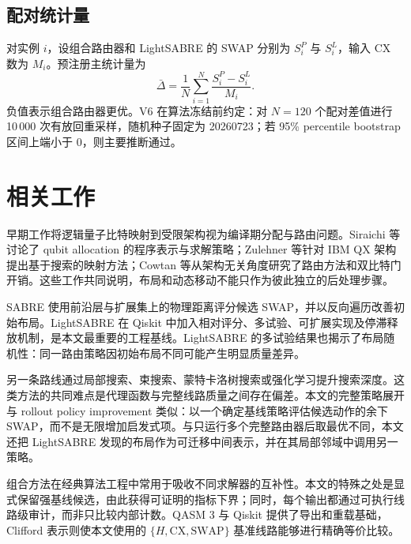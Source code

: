 \documentclass[11pt,a4paper]{article}
\begin{document}
\subsection{配对统计量}

对实例 $i$，设组合路由器和 LightSABRE 的 SWAP 分别为 $S_i^{P}$ 与 $S_i^{L}$，输入 CX 数为 $M_i$。预注册主统计量为
\begin{equation}
  \bar{\Delta}
  =\frac{1}{N}\sum_{i=1}^{N}
  \frac{S_i^{P}-S_i^{L}}{M_i}.
  \label{eq:normalized-gap}
\end{equation}
负值表示组合路由器更优。V6 在算法冻结前约定：对 $N=120$ 个配对差值进行 10\,000 次有放回重采样，随机种子固定为 20260723；若 95\% percentile bootstrap 区间上端小于 0，则主要推断通过\citep{Efron1979Bootstrap}。

\section{相关工作}

早期工作将逻辑量子比特映射到受限架构视为编译期分配与路由问题。Siraichi 等讨论了 qubit allocation 的程序表示与求解策略\citep{Siraichi2018QubitAllocation}；Zulehner 等针对 IBM QX 架构提出基于搜索的映射方法\citep{Zulehner2018Mapping}；Cowtan 等从架构无关角度研究了路由方法和双比特门开销\citep{Cowtan2019Routing}。这些工作共同说明，布局和动态移动不能只作为彼此独立的后处理步骤。

SABRE 使用前沿层与扩展集上的物理距离评分候选 SWAP，并以反向遍历改善初始布局\citep{Li2019SABRE}。LightSABRE 在 Qiskit 中加入相对评分、多试验、可扩展实现及停滞释放机制，是本文最重要的工程基线\citep{Zou2024LightSABRE,JavadiAbhari2024Qiskit}。LightSABRE 的多试验结果也揭示了布局随机性：同一路由策略因初始布局不同可能产生明显质量差异。

另一条路线通过局部搜索、束搜索、蒙特卡洛树搜索或强化学习提升搜索深度\citep{Luo2025LocalSearch,Zhou2020MCTS,Herbert2022RLRouter}。这类方法的共同难点是代理函数与完整线路质量之间存在偏差。本文的完整策略展开与 rollout policy improvement 类似：以一个确定基线策略评估候选动作的余下 SWAP，而不是无限增加启发式项。与只运行多个完整路由器后取最优不同，本文还把 LightSABRE 发现的布局作为可迁移中间表示，并在其局部邻域中调用另一策略。

组合方法在经典算法工程中常用于吸收不同求解器的互补性。本文的特殊之处是显式保留强基线候选，由此获得可证明的指标下界；同时，每个输出都通过可执行线路级审计，而非只比较内部计数。QASM 3 与 Qiskit 提供了导出和重载基础\citep{Cross2022OpenQASM3,JavadiAbhari2024Qiskit}，Clifford 表示则使本文使用的 $\{H,\mathrm{CX},\mathrm{SWAP}\}$ 基准线路能够进行精确等价比较\citep{Aaronson2004Clifford}。
\end{document}
